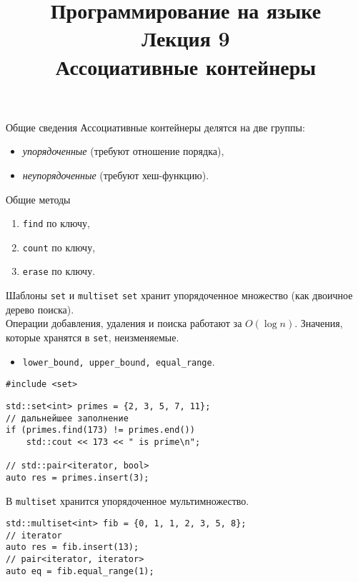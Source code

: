 \documentclass[aspectration=1610,t]{beamer}
\title{{\bf Программирование на языке \langcpp\protect\\Лекция
9\protect\vspace{1em}\\}Ассоциативные контейнеры}
\begin{document}
\begin{frame} 
  \titlepage
\end{frame}

\begin{frame}[fragile]{Общие сведения}
Ассоциативные контейнеры делятся на две группы:
\begin{itemize}
\item \textit{упорядоченные} (требуют отношение порядка), 
\item \textit{неупорядоченные} (требуют хеш-функцию).
\end{itemize}
\begin{block}{Общие методы}
\begin{enumerate}
    \item {\tt find} по ключу,
    \item {\tt count} по ключу,
    \item {\tt erase} по ключу.
\end{enumerate}
\end{block}
\end{frame}

\begin{frame}[fragile]{Шаблоны {\tt set} и {\tt multiset}}
\texttt{set} хранит упорядоченное множество (как двоичное дерево поиска).\\ 
Операции добавления, удаления и поиска работают за $O(\log n)$.
Значения, которые хранятся в \texttt{set}, неизменяемые.
\begin{itemize}
    \item {\tt lower\_bound, upper\_bound, equal\_range}.
\end{itemize}
\begin{lstlisting}
#include <set>
\end{lstlisting}\vspace{-2mm}

\begin{lstlisting}
std::set<int> primes = {2, 3, 5, 7, 11};
// дальнейшее заполнение
if (primes.find(173) != primes.end())
    std::cout << 173 << " is prime\n";
    
// std::pair<iterator, bool>
auto res = primes.insert(3);
\end{lstlisting}
В \texttt{multiset} хранится упорядоченное мультимножество.
\vspace{-1mm}
\begin{lstlisting}
std::multiset<int> fib = {0, 1, 1, 2, 3, 5, 8};
// iterator
auto res = fib.insert(13);
// pair<iterator, iterator>
auto eq = fib.equal_range(1);
\end{lstlisting}
\end{frame}
\end{document}
